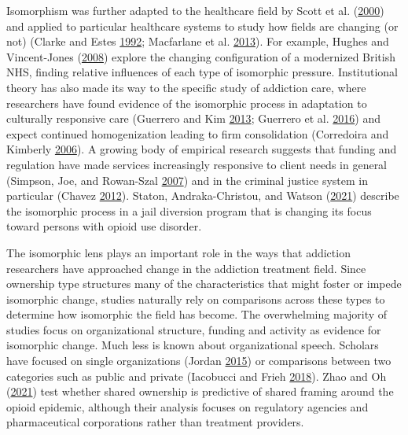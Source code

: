 \documentclass[
  12pt,
]{article}
\begin{document}
Isomorphism was further adapted to the healthcare field by Scott et al. (\protect\hyperlink{ref-scott2000}{2000}) and applied to particular healthcare systems to study how fields are changing (or not) (Clarke and Estes \protect\hyperlink{ref-clarke1992}{1992}; Macfarlane et al. \protect\hyperlink{ref-macfarlane2013}{2013}). For example, Hughes and Vincent-Jones (\protect\hyperlink{ref-hughes2008}{2008}) explore the changing configuration of a modernized British NHS, finding relative influences of each type of isomorphic pressure. Institutional theory has also made its way to the specific study of addiction care, where researchers have found evidence of the isomorphic process in adaptation to culturally responsive care (Guerrero and Kim \protect\hyperlink{ref-guerrero2013}{2013}; Guerrero et al. \protect\hyperlink{ref-guerrero2016}{2016}) and expect continued homogenization leading to firm consolidation (Corredoira and Kimberly \protect\hyperlink{ref-corredoira2006}{2006}). A growing body of empirical research suggests that funding and regulation have made services increasingly responsive to client needs in general (Simpson, Joe, and Rowan-Szal \protect\hyperlink{ref-simpson2007}{2007}) and in the criminal justice system in particular (Chavez \protect\hyperlink{ref-chavez2012}{2012}). Staton, Andraka-Christou, and Watson (\protect\hyperlink{ref-staton2021}{2021}) describe the isomorphic process in a jail diversion program that is changing its focus toward persons with opioid use disorder.

\vspace{12pt}

The isomorphic lens plays an important role in the ways that addiction researchers have approached change in the addiction treatment field. Since ownership type structures many of the characteristics that might foster or impede isomorphic change, studies naturally rely on comparisons across these types to determine how isomorphic the field has become. The overwhelming majority of studies focus on organizational structure, funding and activity as evidence for isomorphic change. Much less is known about organizational speech. Scholars have focused on single organizations (Jordan \protect\hyperlink{ref-jordan2015}{2015}) or comparisons between two categories such as public and private (Iacobucci and Frieh \protect\hyperlink{ref-iacobucci2018}{2018}). Zhao and Oh (\protect\hyperlink{ref-zhao2021}{2021}) test whether shared ownership is predictive of shared framing around the opioid epidemic, although their analysis focuses on regulatory agencies and pharmaceutical corporations rather than treatment providers.
\end{document}
